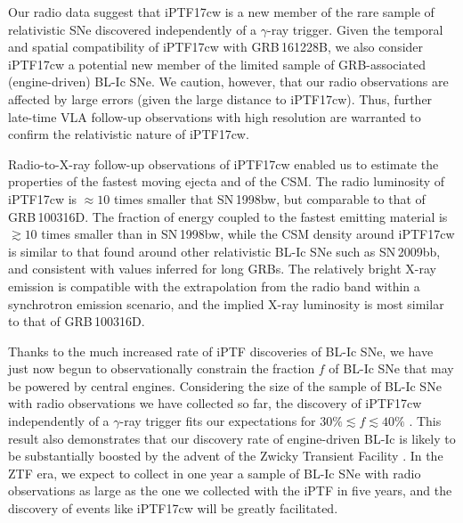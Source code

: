 \documentclass[twocolumn]{emulateapj}
\begin{document}
Our radio data suggest that iPTF17cw is a new member of the rare sample of relativistic SNe discovered independently of a $\gamma$-ray trigger. Given the temporal and spatial compatibility of iPTF17cw with GRB\,161228B, we also consider iPTF17cw a potential new member of the limited sample of GRB-associated (engine-driven) BL-Ic SNe. We caution, however, that our radio observations are affected by large errors (given the large distance to iPTF17cw). Thus, further late-time VLA follow-up observations with high resolution are warranted to confirm the relativistic nature of iPTF17cw.

Radio-to-X-ray follow-up observations of iPTF17cw enabled us to estimate the properties of the fastest moving ejecta and of the CSM. The radio luminosity of iPTF17cw is $\approx 10$ times smaller that SN\,1998bw, but comparable to that of GRB\,100316D. The fraction of energy coupled to the fastest emitting material is $\gtrsim 10$ times smaller than in SN\,1998bw, while the CSM density around iPTF17cw is similar to that found around other relativistic BL-Ic SNe such as SN\,2009bb, and consistent with values inferred for long GRBs. The relatively bright X-ray emission is compatible with the extrapolation from the radio band within a synchrotron emission scenario, and the implied X-ray luminosity is most similar to that of GRB\,100316D. 

Thanks to the much increased rate of iPTF discoveries of BL-Ic SNe, we have just now begun to observationally constrain the fraction $f$ of BL-Ic SNe that may be powered by central engines. Considering the size of the sample of BL-Ic SNe with radio observations we have collected so far, the discovery of iPTF17cw independently of a $\gamma$-ray trigger fits our expectations for $30\%\lesssim f\lesssim 40\%$ \citep{Corsi2016,Podsiadlowski2004}. This result also demonstrates that our discovery rate of engine-driven BL-Ic is likely to be substantially boosted by the advent of the Zwicky Transient Facility \citep[ZTF;][]{Smith2014,Bellm2016}. In the ZTF era, we expect to collect in one year a sample of BL-Ic SNe with radio observations as large as the one we collected with the iPTF in five years, and the discovery of events like iPTF17cw will be greatly facilitated.\\
\newline
\end{document}
